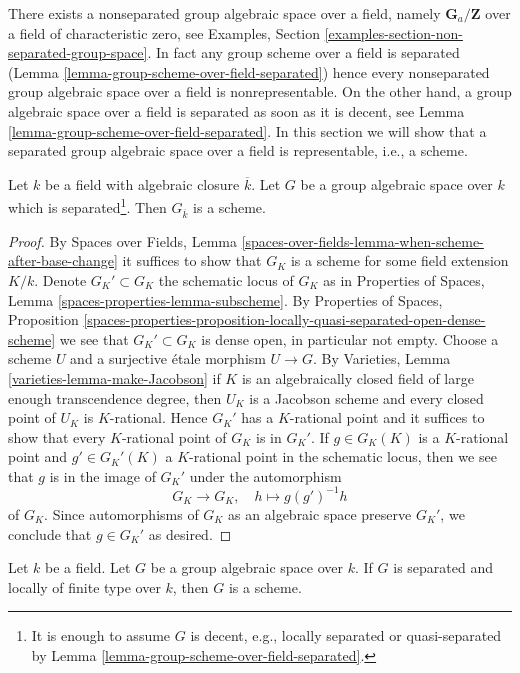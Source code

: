 \noindent
There exists a nonseparated group algebraic space over a field,
namely $\mathbf{G}_a/\mathbf{Z}$ over a field of characteristic zero, see
Examples, Section \ref{examples-section-non-separated-group-space}.
In fact any group scheme over a field is separated
(Lemma \ref{lemma-group-scheme-over-field-separated})
hence every nonseparated group algebraic space over a field
is nonrepresentable. On the other hand, a group algebraic
space over a field is separated as soon as it is decent, see
Lemma \ref{lemma-group-scheme-over-field-separated}.
In this section we will show that
a separated group algebraic space over a field
is representable, i.e., a scheme.

\begin{lemma}
\label{lemma-group-space-scheme-over-kbar}
Let $k$ be a field with algebraic closure $\overline{k}$.
Let $G$ be a group algebraic space over $k$
which is separated\footnote{It is enough to assume $G$ is decent,
e.g., locally separated or quasi-separated by
Lemma \ref{lemma-group-scheme-over-field-separated}.}.
Then $G_{\overline{k}}$ is a scheme.
\end{lemma}

\begin{proof}
By Spaces over Fields, Lemma
\ref{spaces-over-fields-lemma-when-scheme-after-base-change}
it suffices to show that $G_K$ is a scheme for some field
extension $K/k$. Denote $G_K' \subset G_K$ the schematic
locus of $G_K$ as in Properties of Spaces, Lemma
\ref{spaces-properties-lemma-subscheme}.
By Properties of Spaces, Proposition
\ref{spaces-properties-proposition-locally-quasi-separated-open-dense-scheme}
we see that $G_K' \subset G_K$ is dense open, in particular not empty.
Choose a scheme $U$ and a surjective \'etale morphism $U \to G$. By
Varieties, Lemma \ref{varieties-lemma-make-Jacobson}
if $K$ is an algebraically closed field of large enough
transcendence degree, then $U_K$ is a Jacobson scheme and
every closed point of $U_K$ is $K$-rational.
Hence $G_K'$ has a $K$-rational point and it suffices
to show that every $K$-rational point of $G_K$ is in $G_K'$.
If $g \in G_K(K)$ is a $K$-rational point and $g' \in G_K'(K)$
a $K$-rational point in the schematic locus, then we see that
$g$ is in the image of $G_K'$ under the automorphism
$$
G_K \longrightarrow G_K,\quad
h \longmapsto g(g')^{-1}h
$$
of $G_K$. Since automorphisms of $G_K$ as an algebraic space preserve
$G_K'$, we conclude that $g \in G_K'$ as desired.
\end{proof}

\begin{lemma}
\label{lemma-group-space-scheme-locally-finite-type-over-k}
Let $k$ be a field. Let $G$ be a group algebraic space over $k$.
If $G$ is separated and locally of finite type over $k$,
then $G$ is a scheme.
\end{lemma}

